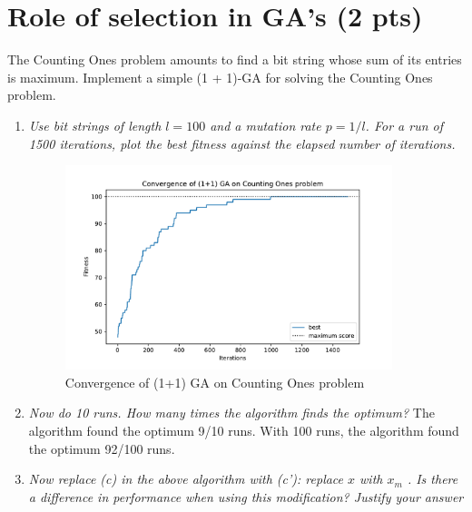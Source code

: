\documentclass{article}
\begin{document}
\section{Role of selection in GA's (2 pts)}
The Counting Ones problem amounts to find a bit string whose sum of its entries is maximum. Implement a simple (1 + 1)-GA for solving the Counting Ones problem.
\begin{enumerate}[label=\alph*)]
    \item \textit{Use bit strings of length $l = 100$ and a mutation rate $p = 1/l$. For a run of 1500 iterations, plot the best fitness against the elapsed number of iterations.}
    \begin{figure}[H]
        \centering
        \includegraphics[width=0.9\textwidth]{Assignment 1/Figures/A1_4a.pdf}
        \caption{Convergence of (1+1) GA on Counting Ones problem}
        \label{fig:A1_4a}
    \end{figure}
    \item \textit{Now do 10 runs. How many times the algorithm finds the optimum?}
    The algorithm found the optimum 9/10 runs. With 100 runs, the algorithm found the optimum 92/100 runs. 
    \item \textit{Now replace (c) in the above algorithm with (c'): replace $x$ with $x_m$ . Is there a difference in performance when using this modification? Justify your answer} \\ 
    

\end{enumerate}
\end{document}
